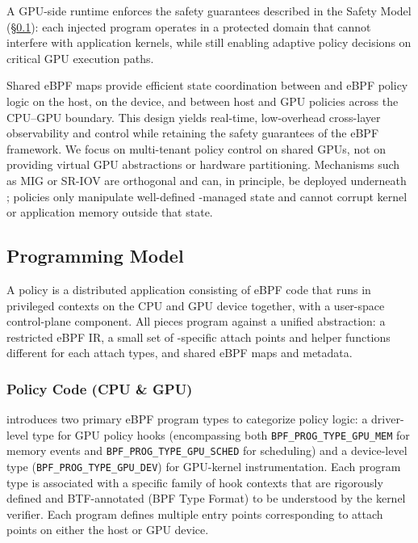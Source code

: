 A GPU-side runtime enforces the safety guarantees described in the Safety Model (\S\ref{sec:prog-model}): each injected program operates in a protected domain that cannot interfere with application kernels, while still enabling adaptive policy decisions on critical GPU execution paths.

Shared eBPF maps provide efficient state coordination between \sysdriver and eBPF policy logic on the host, on the device, and between host and GPU policies across the CPU--GPU boundary. This design yields real-time, low-overhead cross-layer observability and control while retaining the safety guarantees of the eBPF framework. We focus on multi-tenant policy control on shared GPUs, not on providing virtual GPU abstractions or hardware partitioning. Mechanisms such as MIG or SR-IOV are orthogonal and can, in principle, be deployed underneath \sys; \sys policies only manipulate well-defined \sys-managed state and cannot corrupt kernel or application memory outside that state.


\subsection{\sys Programming Model}
\label{sec:prog-model}

A \sys policy is a distributed application consisting of eBPF code that runs in
privileged contexts on the CPU and GPU device together, with a user-space control-plane
component. All pieces program against a unified abstraction: a restricted eBPF IR,
a small set of \sys-specific attach points and helper functions different for each attach types, and shared eBPF maps and metadata.

\subsubsection{Policy Code (CPU \& GPU)}

\sys introduces two primary eBPF program types to categorize policy logic:
a driver-level type for GPU policy hooks (encompassing both \texttt{BPF\_PROG\_TYPE\_GPU\_MEM} for memory events and \texttt{BPF\_PROG\_TYPE\_GPU\_SCHED} for scheduling) and a device-level type (\texttt{BPF\_PROG\_TYPE\_GPU\_DEV}) for GPU-kernel instrumentation. Each program type is associated with a specific family of hook contexts that are rigorously defined and BTF-annotated (BPF Type Format) to be understood by the kernel verifier. Each program defines multiple entry points corresponding to attach points on either the host or GPU device.

